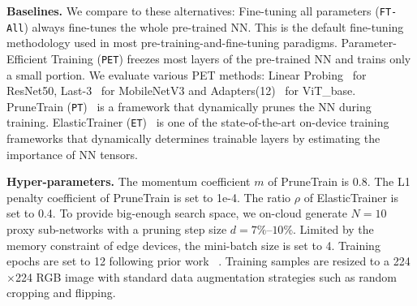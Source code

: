 

\noindent \textbf{Baselines.}
We compare \sys to these alternatives:
Fine-tuning all parameters (\texttt{FT-All}) always fine-tunes the whole pre-trained NN. This is the default fine-tuning methodology used in most pre-training-and-fine-tuning paradigms.
Parameter-Efficient Training (\texttt{PET}) freezes most layers of the pre-trained NN and trains only a small portion. We evaluate various PET methods: Linear Probing~\cite{kumar2022finetuning} for ResNet50, Last-3~\cite{guo2019spottune, MLSYS2019_e09d45e1} for MobileNetV3 and Adapters(12)~\cite{rebuffi2017learning, houlsby2019parameter} for ViT\_base.
PruneTrain (\texttt{PT})~\cite{10.1145/3295500.3356156} is a framework that dynamically prunes the NN during training. %
ElasticTrainer (\texttt{ET})~\cite{huang2023elastictrainer} is one of the state-of-the-art on-device training frameworks that dynamically determines trainable layers by estimating the importance of NN tensors.

\noindent \textbf{Hyper-parameters.}
The momentum coefficient $m$ of PruneTrain is 0.8.
The L1 penalty coefficient of PruneTrain is set to 1e-4.
The ratio $\rho$ of ElasticTrainer is set to 0.4.
To provide big-enough search space, we on-cloud generate $N=10$ proxy sub-networks with a pruning step size $d=7\%$--$10\%$. 
Limited by the memory constraint of edge devices, the mini-batch size is set to 4.
Training epochs are set to 12 following prior work ~\cite{huang2023elastictrainer}.
Training samples are resized to a 224$\times$224 RGB image with standard data augmentation strategies such as random cropping and flipping.



